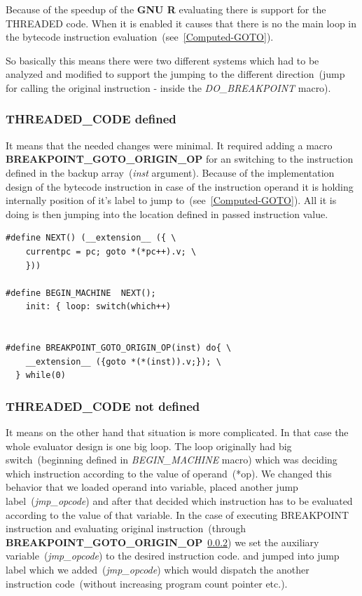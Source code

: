 \documentclass[thesis=M,english]{FITthesis}[2018/10/20]
\begin{document}
Because of the speedup of the \textbf{GNU R} evaluating there is support for the THREADED code. When it is enabled it causes that there is no the main loop in the bytecode instruction evaluation~(see~\ref{Computed-GOTO}). 

So basically this means there were two different systems which had to be analyzed and modified to support the jumping to the different direction~(jump for calling the original instruction - inside the \textit{DO{\_}BREAKPOINT} macro).

\subsubsection{THREADED{\_}CODE defined}
It means that the needed changes were minimal. It required adding a macro \textbf{BREAKPOINT{\_}GOTO{\_}ORIGIN{\_}OP} for an switching to the instruction defined in the backup array~(\textit{inst} argument). Because of the implementation design of the bytecode instruction in case of the instruction operand it is holding internally position of it's label to jump to~(see~\ref{Computed-GOTO}). All it is doing is then jumping into the location defined in passed instruction value.

\begin{lstlisting}
#define NEXT() (__extension__ ({ \
    currentpc = pc; goto *(*pc++).v; \
    }))

#define BEGIN_MACHINE  NEXT(); 
    init: { loop: switch(which++)


#define BREAKPOINT_GOTO_ORIGIN_OP(inst) do{ \
    __extension__ ({goto *(*(inst)).v;}); \
  } while(0)
\end{lstlisting}


\subsubsection{THREADED{\_}CODE not defined}
It means on the other hand that situation is more complicated. In that case the whole evaluator design is one big loop. The loop originally had big switch~(beginning defined in \textit{BEGIN{\_}MACHINE} macro) which was deciding which instruction according to the value of operand~(*op). We changed this behavior that we loaded operand into variable, placed another jump label~(\textit{jmp{\_}opcode}) and after that decided which instruction has to be evaluated according to the value of that variable. In the case of executing BREAKPOINT instruction and evaluating original instruction~(through \textbf{BREAKPOINT{\_}GOTO{\_}ORIGIN{\_}OP}~\ref{}) we set the auxiliary variable~(\textit{jmp{\_}opcode}) to the desired instruction code.  and jumped into jump label which we added~(\textit{jmp{\_}opcode}) which would dispatch the another instruction code~(without increasing program count pointer etc.).
\end{document}
